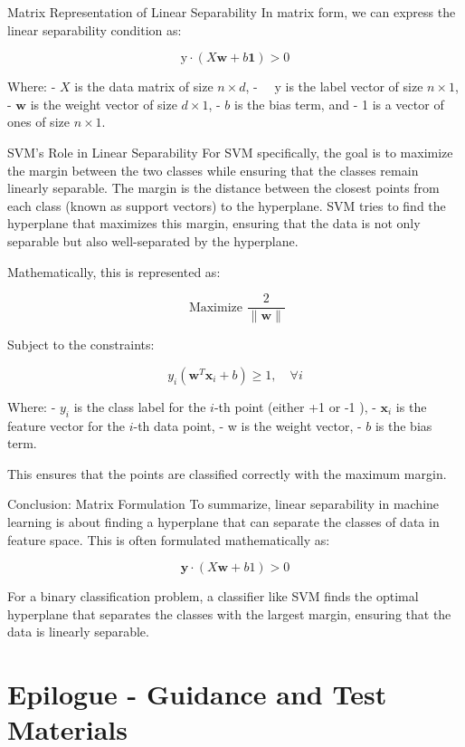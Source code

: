 \documentclass[
  12 pt,
  a4paper,
]{book}
\numberwithin{equation}{section}
\theoremstyle{plain}      %
\theoremstyle{definition} %
\theoremstyle{remark}     %
\theoremstyle{note}         %
\begin{document}
Matrix Representation of Linear Separability In matrix form, we can
express the linear separability condition as:

\[
\mathrm{y} \cdot(X \mathbf{w}+b \mathbf{1})>0
\]

Where: - \(X\) is the data matrix of size \(n \times d\), -
\(\quad \mathrm{y}\) is the label vector of size \(n \times 1\), -
\(\mathbf{w}\) is the weight vector of size \(d \times 1\), - \(b\) is
the bias term, and - 1 is a vector of ones of size \(n \times 1\).

SVM's Role in Linear Separability For SVM specifically, the goal is to
maximize the margin between the two classes while ensuring that the
classes remain linearly separable. The margin is the distance between
the closest points from each class (known as support vectors) to the
hyperplane. SVM tries to find the hyperplane that maximizes this margin,
ensuring that the data is not only separable but also well-separated by
the hyperplane.

Mathematically, this is represented as:

\[
\text { Maximize } \frac{2}{\|\mathbf{w}\|}
\]

Subject to the constraints:

\[
y_i\left(\mathbf{w}^T \mathbf{x}_i+b\right) \geq 1, \quad \forall i
\]

Where: - \(y_i\) is the class label for the \(i\)-th point (either +1 or
-1 ), - \(\mathbf{x}_i\) is the feature vector for the \(i\)-th data
point, - w is the weight vector, - \(b\) is the bias term.

This ensures that the points are classified correctly with the maximum
margin.

Conclusion: Matrix Formulation To summarize, linear separability in
machine learning is about finding a hyperplane that can separate the
classes of data in feature space. This is often formulated
mathematically as:

\[
\mathbf{y} \cdot(X \mathbf{w}+b 1)>0
\]

For a binary classification problem, a classifier like SVM finds the
optimal hyperplane that separates the classes with the largest margin,
ensuring that the data is linearly separable.

\newpage

\hypertarget{epilogue---guidance-and-test-materials}{%
\chapter{Epilogue - Guidance and Test
Materials}\label{epilogue---guidance-and-test-materials}}
\end{document}
